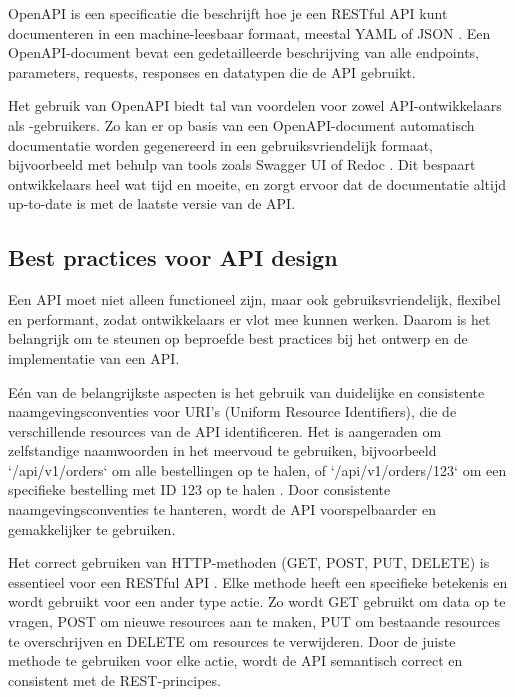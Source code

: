 \bigskip

OpenAPI is een specificatie die beschrijft hoe je een RESTful API kunt documenteren in een machine-leesbaar formaat, meestal YAML of JSON \autocite{Swagger2021}. Een OpenAPI-document bevat een gedetailleerde beschrijving van alle endpoints, parameters, requests, responses en datatypen die de API gebruikt.

\bigskip

Het gebruik van OpenAPI biedt tal van voordelen voor zowel API-ontwikkelaars als -gebruikers. Zo kan er op basis van een OpenAPI-document automatisch documentatie worden gegenereerd in een gebruiksvriendelijk formaat, bijvoorbeeld met behulp van tools zoals Swagger UI of Redoc \autocite{Swagger2021}. Dit bespaart ontwikkelaars heel wat tijd en moeite, en zorgt ervoor dat de documentatie altijd up-to-date is met de laatste versie van de API.

\subsection{Best practices voor API design}

Een API moet niet alleen functioneel zijn, maar ook gebruiksvriendelijk, flexibel en performant, zodat ontwikkelaars er vlot mee kunnen werken. Daarom is het belangrijk om te steunen op beproefde best practices bij het ontwerp en de implementatie van een API.

\bigskip

Eén van de belangrijkste aspecten is het gebruik van duidelijke en consistente naamgevingsconventies voor URI's (Uniform Resource Identifiers), die de verschillende resources van de API identificeren. Het is aangeraden om zelfstandige naamwoorden in het meervoud te gebruiken, bijvoorbeeld `/api/v1/orders` om alle bestellingen op te halen, of `/api/v1/orders/123` om een specifieke bestelling met ID 123 op te halen \autocite{Lange2024}. Door consistente naamgevingsconventies te hanteren, wordt de API voorspelbaarder en gemakkelijker te gebruiken.

\bigskip

Het correct gebruiken van HTTP-methoden (GET, POST, PUT, DELETE) is essentieel voor een RESTful API \autocite{Lange2024}. Elke methode heeft een specifieke betekenis en wordt gebruikt voor een ander type actie. Zo wordt GET gebruikt om data op te vragen, POST om nieuwe resources aan te maken, PUT om bestaande resources te overschrijven en DELETE om resources te verwijderen. Door de juiste methode te gebruiken voor elke actie, wordt de API semantisch correct en consistent met de REST-principes.

